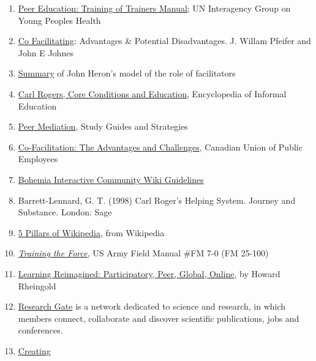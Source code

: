 \begin{enumerate}
\def\labelenumi{\arabic{enumi}.}
\item
  \href{http://www.scribd.com/doc/54544925/51/TRAINING-TOPIC-Co-facilitation-skills}{Peer
  Education: Training of Trainers Manual}; UN Interagency Group on Young
  Peoples Health
\item
  \href{http://www.breakoutofthebox.com/Co-FacilitatingPfeifferJones.pdf}{Co
  Facilitating}: Advantages \& Potential Disadvantages. J. Willam
  Pfeifer and John E Johnes
\item
  \href{http://reviewing.co.uk/archives/art/13_1_what_do_facilitators_do.htm\#8_WAYS_OF_FACILITATING_ACTIVE_LEARNING}{Summary}
  of John Heron's model of the role of facilitators
\item
  \href{http://www.infed.org/thinkers/et-rogers.htm}{Carl Rogers, Core
  Conditions and Education}, Encyclopedia of Informal Education
\item
  \href{http://www.studygs.net/peermed.htm}{Peer Mediation}, Study
  Guides and Strategies
\item
  \href{http://sk.cupe.ca/updir/cofacilitation-handouts.doc}{Co-Facilitation:
  The Advantages and Challenges}, Canadian Union of Public Employees
\item
  \href{http://community.bistudio.com/wiki/Bohemia_Interactive_Community:Guidelines}{Bohemia
  Interactive Community Wiki Guidelines}
\item
  Barrett-Lennard, G. T. (1998) Carl Roger's Helping System.  Journey
  and Substance.  London: Sage
\item
  \href{http://en.wikipedia.org/w/index.php?title=Wikipedia:Five_pillars\&oldid=501472166}{5
  Pillars of Wikipedia}, from Wikipedia
\item \emph{\href{http://www.africom.mil/WO-NCO/DownloadCenter/\%5C40Publications/Training\%20the\%20Force\%20Manual.pdf}{Training
  the Force}}, US Army Field Manual \#FM 7-0 (FM 25-100)
\item
  \href{http://dmlcentral.net/blog/howard-rheingold/learning-reimagined-participatory-peer-global-online}{Learning
  Reimagined: Participatory, Peer, Global, Online}, by Howard Rheingold
\item
  \href{http://www.researchgate.net/}{Research Gate} is a network
  dedicated to science and research, in which members connect,
  collaborate and discover scientific publications, jobs and
  conferences.
\item
  \href{http://ctb.ku.edu/en/tablecontents/section_1180.aspx}{Creating
}
\end{enumerate}
